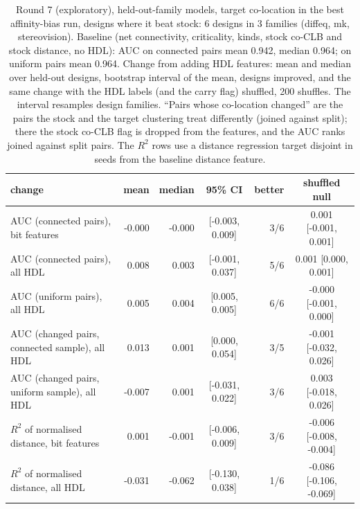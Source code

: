 \begin{table}[t]
\caption{Round 7 (exploratory), held-out-family models, target co-location in the best affinity-bias run, designs where it beat stock: 6 designs in 3 families (diffeq, mk, stereovision). Baseline (net connectivity, criticality, kinds, stock co-CLB and stock distance, no HDL): AUC on connected pairs mean 0.942, median 0.964; on uniform pairs mean 0.964. Change from adding HDL features: mean and median over held-out designs, bootstrap interval of the mean, designs improved, and the same change with the HDL labels (and the carry flag) shuffled, 200 shuffles. The interval resamples design families. ``Pairs whose co-location changed'' are the pairs the stock and the target clustering treat differently (joined against split); there the stock co-CLB flag is dropped from the features, and the AUC ranks joined against split pairs. The $R^2$ rows use a distance regression target disjoint in seeds from the baseline distance feature.}
\label{tab:r7modelaff}
\centering\scriptsize
\begin{tabular}{@{}lrrcrc@{}}
\toprule
change & mean & median & 95\% CI & better & shuffled null \\
\midrule
AUC (connected pairs), bit features & -0.000 & -0.000 & [-0.003, 0.009] & 3/6 & 0.001 [-0.001, 0.001] \\
AUC (connected pairs), all HDL & 0.008 & 0.003 & [-0.001, 0.037] & 5/6 & 0.001 [0.000, 0.001] \\
AUC (uniform pairs), all HDL & 0.005 & 0.004 & [0.005, 0.005] & 6/6 & -0.000 [-0.001, 0.000] \\
AUC (changed pairs, connected sample), all HDL & 0.013 & 0.001 & [0.000, 0.054] & 3/5 & -0.001 [-0.032, 0.026] \\
AUC (changed pairs, uniform sample), all HDL & -0.007 & 0.001 & [-0.031, 0.022] & 3/6 & 0.003 [-0.018, 0.026] \\
$R^2$ of normalised distance, bit features & 0.001 & -0.001 & [-0.006, 0.009] & 3/6 & -0.006 [-0.008, -0.004] \\
$R^2$ of normalised distance, all HDL & -0.031 & -0.062 & [-0.130, 0.038] & 1/6 & -0.086 [-0.106, -0.069] \\
\bottomrule
\end{tabular}
\end{table}

